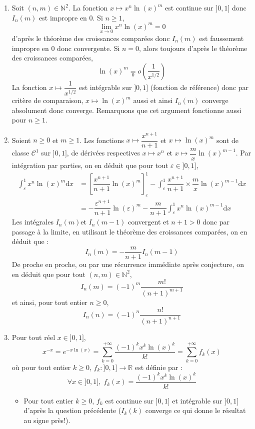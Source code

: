 \documentclass[a4paper,twoside,french,10pt]{VcCours}
\newcommand{\dx}{\text{d}x}
\begin{document}
\begin{enumerate}
\item Soit $(n,m) \in \mathbb{N}^2$. La fonction $x \mapsto x^n \ln(x)^m$ est continue sur $]0,1]$ donc $I_n(m)$ est impropre en $0$. Si $n \geq 1$, 
$$ \lim_{x \rightarrow 0} x^n \ln(x)^m =0$$
d'après le théorème des croissances comparées donc $I_n(m)$ est faussement impropre en $0$ donc convergente. Si $n=0$, alors toujours d'après le théorème des croissances comparées,
$$ \ln(x)^m \underset{0}{=} o \left( \dfrac{1}{x^{1/2}} \right)$$
La fonction $x \mapsto \dfrac{1}{x^{1/2}}$ est intégrable sur $]0,1]$ (fonction de référence) donc par critère de comparaison, $x \mapsto \ln(x)^m$ aussi et ainsi $I_n(m)$ converge absolument donc converge. Remarquons que cet argument fonctionne aussi pour $n \geq 1$.
\item Soient $n \geq 0$ et $m \geq 1$. Les fonctions $x \mapsto \dfrac{x^{n+1}}{n+1}$ et $x \mapsto \ln(x)^m$ sont de classe $\mathcal{C}^1$ sur $]0,1]$, de dérivées respectives $x \mapsto x^n$ et $x \mapsto \dfrac{m}{x} \ln(x)^{m-1}$. Par intégration par parties, on en déduit que pour tout $\varepsilon \in ]0,1]$,
\begin{align*}
\int_{\varepsilon}^1 x^n \ln(x)^m \dx & = \left[ \dfrac{x^{n+1}}{n+1} \ln(x)^m \right]_{\varepsilon}^1 - \int_{\varepsilon}^1 \dfrac{x^{n+1}}{n+1} \times \dfrac{m}{x} \ln(x)^{m-1} \dx \\
& = -\dfrac{\varepsilon^{n+1}}{n+1} \ln(\varepsilon)^m  -  \dfrac{m}{n+1} \int_{\varepsilon}^1 x^n \ln(x)^{m-1} \dx 
\end{align*}
Les intégrales $I_n(m)$et $I_n(m-1)$ convergent et $n+1>0$ donc par passage à la limite, en utilisant le théorème des croissances comparées, on en déduit que :
$$ I_n(m) = - \dfrac{m}{n+1} I_n(m-1)$$
De proche en proche, ou par une récurrence immédiate après conjecture, on en déduit que pour tout $(n,m) \in \mathbb{N}^2$,
$$ I_n(m) = (-1)^m \dfrac{m!}{(n+1)^{m+1}}$$
et ainsi, pour tout entier $n \geq 0$,
$$ I_n(n)= (-1)^n \dfrac{n!}{(n+1)^{n+1}}$$
\item Pour tout réel $x \in ]0,1]$,
$$ x^{-x} = e^{-x \ln(x)} = \sum_{k=0}^{+ \infty} \dfrac{(-1)^k x^k \ln(x)^k}{k!} = \sum_{k=0}^{+ \infty} f_k(x)$$
où pour tout entier $k \geq 0$, $f_k : ]0,1] \rightarrow \mathbb{R}$ est définie par :
$$ \forall x \in ]0,1], \; f_k(x) =  \dfrac{(-1)^k x^k \ln(x)^k}{k!}$$
\begin{itemize}
\item Pour tout entier $k \geq 0$, $f_k$ est continue sur $]0,1]$ et intégrable sur $]0,1]$ d'après la question précédente ($I_k(k)$ converge ce qui donne le résultat au signe près!).

\end{itemize}
\end{enumerate}
\end{document}
